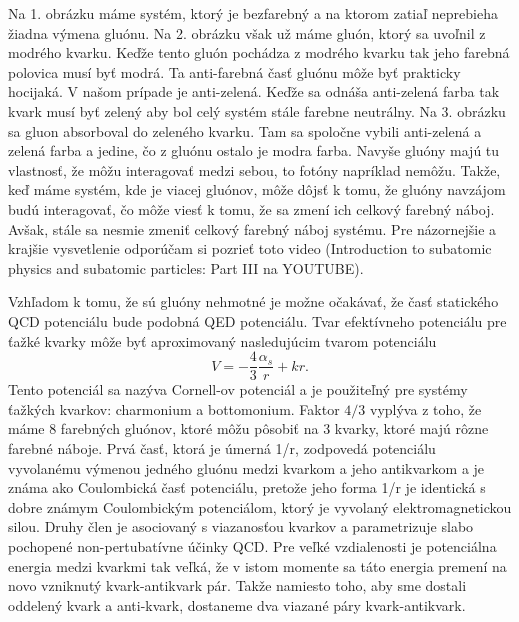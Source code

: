 \documentclass[../../main.tex]{subfiles}
\begin{document}
Na 1. obrázku máme systém, ktorý je bezfarebný a na ktorom zatiaľ neprebieha žiadna výmena gluónu. Na 2. obrázku však už máme gluón, ktorý sa uvoľnil z modrého kvarku. Keďže tento gluón pochádza z modrého kvarku tak jeho farebná polovica musí byť modrá. Ta anti-farebná časť gluónu môže byť prakticky hocijaká. V našom prípade je anti-zelená. Keďže sa odnáša anti-zelená farba tak kvark musí byť zelený aby bol celý systém stále farebne neutrálny. Na 3. obrázku sa gluon absorboval do zeleného kvarku. Tam sa spoločne vybili anti-zelená a zelená farba a jedine, čo z gluónu ostalo je modra farba. Navyše gluóny majú tu vlastnosť, že môžu interagovať medzi sebou, to fotóny napríklad nemôžu. Takže, keď máme systém, kde je viacej gluónov, môže dôjsť k tomu, že gluóny navzájom budú interagovať, čo môže viesť k tomu, že sa zmení ich celkový farebný náboj. Avšak, stále sa nesmie zmeniť celkový farebný náboj systému. Pre názornejšie a krajšie vysvetlenie odporúčam si pozrieť toto video (Introduction to subatomic physics and subatomic particles: Part III na YOUTUBE).

Vzhľadom k tomu, že sú gluóny nehmotné je možne očakávať, že časť statického QCD potenciálu bude podobná QED potenciálu. Tvar efektívneho potenciálu pre ťažké kvarky môže byť aproximovaný nasledujúcim tvarom potenciálu 
$$
V = -\frac{4}{3}\frac{\alpha_s}{r}+kr.
$$ 
Tento potenciál sa nazýva Cornell-ov potenciál a je použiteľný pre systémy ťažkých kvarkov: charmonium a bottomonium. Faktor $4/3$ vyplýva z toho, že máme 8 farebných gluónov, ktoré môžu pôsobiť na 3 kvarky, ktoré majú rôzne farebné náboje. Prvá časť, ktorá je úmerná 1/r, zodpovedá potenciálu vyvolanému výmenou jedného gluónu medzi kvarkom a jeho antikvarkom a je známa ako Coulombická časť potenciálu, pretože jeho forma 1/r je identická s dobre známym Coulombickým potenciálom, ktorý je vyvolaný elektromagnetickou silou. Druhy člen je asociovaný s viazanosťou kvarkov a parametrizuje slabo pochopené non-pertubatívne účinky QCD. Pre veľké vzdialenosti je potenciálna energia medzi kvarkmi tak veľká, že v istom momente sa táto energia premení na novo vzniknutý kvark-antikvark pár. Takže namiesto toho, aby sme dostali oddelený kvark a anti-kvark, dostaneme dva viazané páry kvark-antikvark.
\end{document}
